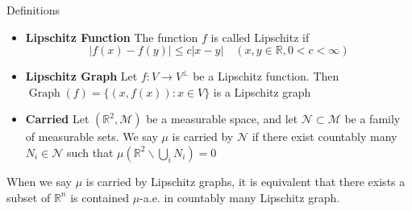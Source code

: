 \documentclass[final]{beamer}
\newlength{\colwidth}
\newcommand{\rr}{\mathbb R}
\begin{document}
\begin{frame}[t]
\begin{columns}[t]
\begin{column}{\colwidth}
\begin{block}{Definitions}
\begin{itemize}
    \begin{figure}
      \centering
    \caption{Cones Visualization}%
    \label{fig:conevis}%
    \end{figure}
        \item \textbf{Lipschitz Function} The function $f$ is called Lipschitz if
        $$
        |f(x)-f(y)| \leq c|x-y| \quad(x, y \in \rr, 0<c<\infty)
        $$
        \item \textbf{Lipschitz Graph}
        Let $f: V\rightarrow V^\bot$ be a Lipschitz function. Then $\operatorname{Graph}(f) = \{(x, f(x)): x\in V\}$ is a Lipschitz graph
        
        \item \textbf{Carried}   Let $(\mathbb{R}^2, \mathcal{M})$ be a measurable space, and let $\mathcal{N} \subset \mathcal{M}$ be a family of measurable sets. We say $\mu$ is carried by $\mathcal{N}$ if there exist countably many $N_{i} \in \mathcal{N}$ such that $\mu\left(\mathbb{R}^2 \backslash \bigcup_{i} N_{i}\right)=0$
    \end{itemize}
    When we say $\mu$ is carried by Lipschitz graphs, it is equivalent that there exists a subset of $\rr^n$ is contained $\mu$-a.e. in countably many Lipschitz graph. 
\end{block}


\end{column}
\end{columns}
\end{frame}
\end{document}
